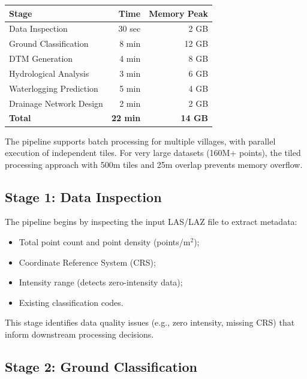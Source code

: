\documentclass[a4paper,12pt]{article}
\begin{document}
\begin{table}[H]
	\centering
	\begin{tabularx}{0.8\linewidth}{|L|R|R|}
		\toprule
		\textbf{Stage}          & \textbf{Time}   & \textbf{Memory Peak} \\
		\midrule
		Data Inspection         & 30 sec          & 2 GB                 \\
		Ground Classification   & 8 min           & 12 GB                \\
		DTM Generation          & 4 min           & 8 GB                 \\
		Hydrological Analysis   & 3 min           & 6 GB                 \\
		Waterlogging Prediction & 5 min           & 4 GB                 \\
		Drainage Network Design & 2 min           & 2 GB                 \\
		\hline
		\textbf{Total}          & \textbf{22 min} & \textbf{14 GB}       \\
		\bottomrule
	\end{tabularx}
\end{table}

\bigskip

The pipeline supports batch processing for multiple villages, with parallel execution of independent tiles. For very large datasets (160M+ points), the tiled processing approach with 500m tiles and 25m overlap prevents memory overflow.

\subsection{Stage 1: Data Inspection}

The pipeline begins by inspecting the input LAS/LAZ file to extract metadata:
\begin{itemize}
	\item Total point count and point density (points/m$^2$);
	\item Coordinate Reference System (CRS);
	\item Intensity range (detects zero-intensity data);
	\item Existing classification codes.
\end{itemize}

This stage identifies data quality issues (e.g., zero intensity, missing CRS) that inform downstream processing decisions.

\subsection{Stage 2: Ground Classification}
\end{document}

